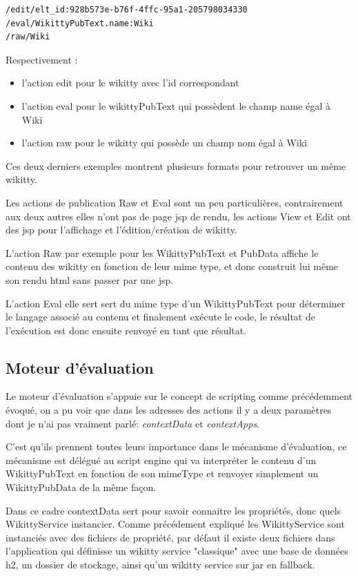 \begin{verbatim}
/edit/elt_id:928b573e-b76f-4ffc-95a1-205798034330 
/eval/WikittyPubText.name:Wiki
/raw/Wiki
\end{verbatim}


Respectivement :
\begin{itemize}
\item l'action edit pour le wikitty avec l'id correspondant
\item l'action eval pour le wikittyPubText qui possèdent le champ name égal à
Wiki
\item l'action raw pour le wikitty qui possède un champ nom égal à Wiki
\end{itemize}

Ces deux derniers exemples montrent plusieurs formats pour retrouver un même
wikitty. 

Les actions de publication Raw et Eval sont un peu particulières, contrairement
aux deux autres elles n'ont pas de page jsp de rendu, les actions View et Edit
ont des jsp pour l'affichage et l'édition/création de wikitty.

L'action Raw par exemple pour les WikittyPubText et PubData affiche le contenu
des wikitty en fonction de leur mime type, et donc construit lui même son rendu
html sans passer par une jsp.

L'action Eval elle sert sert du mime type d'un WikittyPubText pour déterminer le
langage associé au contenu et finalement exécute le code, le résultat de
l'exécution est donc ensuite renvoyé en tant que résultat.

\subsection{Moteur d'évaluation}

Le moteur d'évaluation s'appuie sur le concept de scripting comme précédemment 
évoqué, on a pu voir que dans les adresses des actions il y a deux paramètres
dont je n'ai pas vraiment parlé: \emph{contextData} et \emph{contextApps}.

C'est qu'ils prennent toutes leurs importance dans le mécanisme d'évaluation,
ce mécanisme est délégué au script engine qui va interpréter le contenu
d'un WikittyPubText en fonction de son mimeType et renvoyer simplement un 
WikittyPubData de la même façon.

Dans ce cadre contextData sert pour savoir connaitre les propriétés, donc
quels WikittyService instancier. Comme précédement expliqué les WikittyService 
sont instanciés avec des fichiers de propriété, par défaut il existe deux fichiers
dans l'application qui définisse un wikitty service "classique" avec une base
de données h2, un dossier de stockage, ainsi qu'un wikitty service sur jar
en fallback. 

